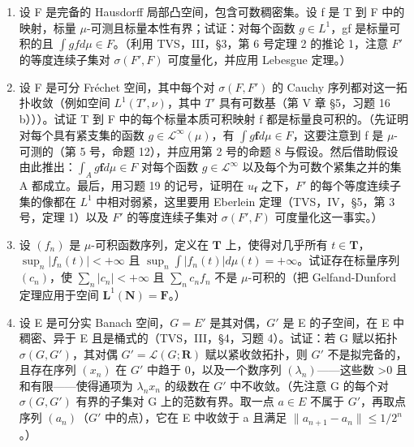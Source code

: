 \begin{enumerate}
\def\labelenumi{\arabic{enumi})}
\setcounter{enumi}{23}
\item
  设 F 是完备的 Hausdorff 局部凸空间，包含可数稠密集。设 f 是 T 到 F 中的映射，标量 \(\mu\)-可测且标量本性有界；试证：对每个函数 \(g \in L^{1}\)，gf 是标量可积的且 \(\int g f d\mu \in F\)。（利用 TVS，III，§3，第 6 号定理 2 的推论 1，注意 \(F'\) 的等度连续子集对 \(\sigma(F', F)\) 可度量化，并应用 Lebesgue 定理。）
\item
  设 F 是可分 Fréchet 空间，其中每个对 \(\sigma(F, F')\) 的 Cauchy 序列都对这一拓扑收敛（例如空间 \(L^1(T', \nu)\)，其中 \(T'\) 具有可数基（第 V 章 §5，习题 16 b）））。试证 T 到 F 中的每个标量本质可积映射 f 都是标量良可积的。（先证明对每个具有紧支集的函数 \(g \in \mathcal{L}^\infty(\mu)\)，有 \(\int g\mathbf{f} d\mu \in F\)，这要注意到 f 是 \(\mu\)-可测的（第 5 号，命题 12），并应用第 2 号的命题 8 与假设。然后借助假设由此推出：\(\int_A g\mathbf{f} d\mu \in F\) 对每个函数 \(g \in \mathcal{L}^\infty\) 以及每个为可数个紧集之并的集 A 都成立。最后，用习题 19 的记号，证明在 \(u_{\mathbf{f}}\) 之下，\(F'\) 的每个等度连续子集的像都在 \(L^1\) 中相对弱紧，这里要用 Eberlein 定理（TVS，IV，§5，第 3 号，定理 1）以及 \(F'\) 的等度连续子集对 \(\sigma(F', F)\) 可度量化这一事实。）
\item
  设 \((f_n)\) 是 \(\mu\)-可积函数序列，定义在 \(\mathbf{T}\) 上，使得对几乎所有 \(t \in \mathbf{T}\)，\(\sup_{n} |f_n(t)| < +\infty\) 且 \(\sup_{n} \int |f_n(t)| d\mu(t) = +\infty\)。试证存在标量序列 \((c_n)\)，使 \(\sum_{n} |c_n| < +\infty\) 且 \(\sum_{n} c_n f_n\) 不是 \(\mu\)-可积的（把 Gelfand-Dunford 定理应用于空间 \(\mathbf{L}^1(\mathbf{N}) = \mathbf{F}\)。）
\item
  设 E 是可分实 Banach 空间，\(G = E'\) 是其对偶，\(G'\) 是 E 的子空间，在 E 中稠密、异于 E 且是桶式的（TVS，III，§4，习题 4）。试证：若 G 赋以拓扑 \(\sigma(G, G')\)，其对偶 \(G' = \mathcal{L}(G; \mathbf{R})\) 赋以紧收敛拓扑，则 \(G'\) 不是拟完备的，且存在序列 \((x_n)\) 在 \(G'\) 中趋于 0，以及一个数序列 \((\lambda_n)\)——这些数 \textgreater0 且和有限——使得通项为 \(\lambda_n x_n\) 的级数在 \(G'\) 中不收敛。（先注意 G 的每个对 \(\sigma(G, G')\) 有界的子集对 G 上的范数有界。取一点 \(a \in E\) 不属于 \(G'\)，再取点序列 \((a_n)\)（\(G'\) 中的点），它在 E 中收敛于 a 且满足 \(\|a_{n+1} - a_n\| \leqslant 1/2^n\)。）
\end{enumerate}

\setcounter{exercisegroup}{2}
\edef\CurrentExerciseGroup{\arabic{exercisegroup}}
